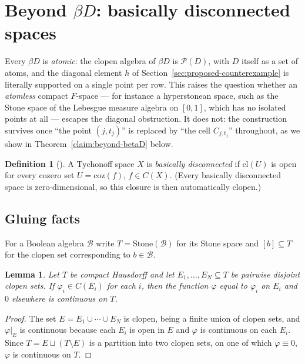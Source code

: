 \documentclass{amsart}
\newtheorem{lemma}[theorem]{Lemma}
\theoremstyle{definition}
\newtheorem{definition}[theorem]{Definition}
\theoremstyle{remark}
\newcommand{\cont}[1]{C\left(#1\right)}
\begin{document}
\section{Beyond \(\beta D\): basically disconnected spaces}
\label{sec:beyond-betaD}

Every $\beta D$ is \emph{atomic}: the clopen algebra of $\beta D$ is
$\mathcal P(D)$, with $D$ itself as a set of atoms, and the diagonal
element $h$ of Section~\ref{sec:proposed-counterexample} is literally
supported on a single point per row. This raises the question whether an
\emph{atomless} compact $F$-space --- for instance a hyperstonean space,
such as the Stone space of the Lebesgue measure algebra on $[0,1]$, which
has no isolated points at all --- escapes the diagonal obstruction. It
does not: the construction survives once ``the point $(j,t_j)$'' is
replaced by ``the cell $C_{j,t_j}$'' throughout, as we show in
Theorem~\ref{claim:beyond-betaD} below.

\begin{definition}[\cite{GillmanJerison}]\label{def:basically-disconnected}
A Tychonoff space $X$ is \emph{basically disconnected} if $\mathrm{cl}(U)$
is open for every cozero set $U=\mathrm{coz}(f)$, $f\in\cont{X}$.
(Every basically disconnected space is zero-dimensional, so this closure
is then automatically clopen.)
\end{definition}

\subsection{Gluing facts}

For a Boolean algebra $\mathcal B$ write $T=\mathrm{Stone}(\mathcal B)$
for its Stone space and $[b]\subseteq T$ for the clopen set corresponding
to $b\in\mathcal B$.

\begin{lemma}\label{lem:finite-gluing}
Let $T$ be compact Hausdorff and let $E_1,\dots,E_N\subseteq T$ be
pairwise disjoint clopen sets. If $\varphi_i\in\cont{E_i}$ for
each $i$, then the function $\varphi$ equal to $\varphi_i$ on $E_i$ and
$0$ elsewhere is continuous on $T$.
\end{lemma}

\begin{proof}
The set $E=E_1\cup\cdots\cup E_N$ is clopen, being a finite union of
clopen sets, and $\varphi|_E$ is continuous because each $E_i$ is open in
$E$ and $\varphi$ is continuous on each $E_i$. Since $T=E\sqcup
(T\setminus E)$ is a partition into two clopen sets, on one of which
$\varphi\equiv0$, $\varphi$ is continuous on $T$.
\end{proof}
\end{document}
